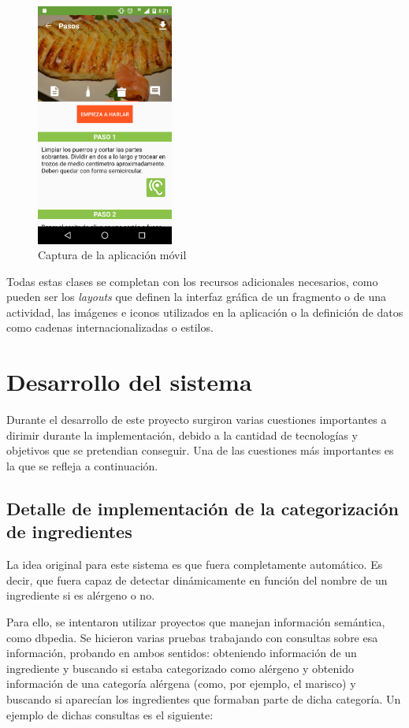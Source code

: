 \documentclass[a4paper,12pt]{article}
\begin{document}
\begin{figure}[H]
  \centering
  \includegraphics[width=0.4\textwidth]{./img/captura}
  \caption{Captura de la aplicación móvil}
  \label{fig:captura}
\end{figure}

Todas estas clases se completan con los recursos adicionales necesarios, como
pueden ser los \textit{layouts} que definen la interfaz gráfica de un fragmento
o de una actividad, las imágenes e iconos utilizados en la aplicación o la
definición de datos como cadenas internacionalizadas o estilos.


\section{Desarrollo del sistema}

Durante el desarrollo de este proyecto surgiron varias cuestiones importantes
a dirimir durante la implementación, debido a la cantidad de tecnologías y
objetivos que se pretendian conseguir. Una de las cuestiones más importantes es
la que se refleja a continuación.

\subsection{Detalle de implementación de la categorización de ingredientes}

La idea original para este sistema es que fuera completamente automático. Es
decir, que fuera capaz de detectar dinámicamente en función del nombre de un
ingrediente si es alérgeno o no.

Para ello, se intentaron utilizar proyectos que manejan información semántica,
como dbpedia. Se hicieron varias pruebas trabajando con consultas sobre esa
información, probando en ambos sentidos: obteniendo información de un ingrediente
y buscando si estaba categorizado como alérgeno y  obtenido información de una
categoría alérgena (como, por ejemplo, el marisco) y buscando si aparecían
los ingredientes que formaban parte de dicha categoría. Un ejemplo de dichas
consultas es el siguiente:
\end{document}
